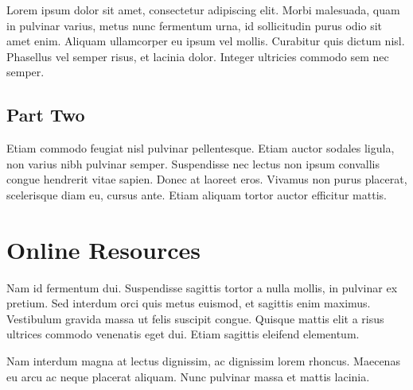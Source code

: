 \documentclass[manuscript,review,screen,nonacm,sigplan]{acmart}
\begin{document}
Lorem ipsum dolor sit amet, consectetur adipiscing elit. Morbi
malesuada, quam in pulvinar varius, metus nunc fermentum urna, id
sollicitudin purus odio sit amet enim. Aliquam ullamcorper eu ipsum
vel mollis. Curabitur quis dictum nisl. Phasellus vel semper risus, et
lacinia dolor. Integer ultricies commodo sem nec semper.

\subsection{Part Two}

Etiam commodo feugiat nisl pulvinar pellentesque. Etiam auctor sodales
ligula, non varius nibh pulvinar semper. Suspendisse nec lectus non
ipsum convallis congue hendrerit vitae sapien. Donec at laoreet
eros. Vivamus non purus placerat, scelerisque diam eu, cursus
ante. Etiam aliquam tortor auctor efficitur mattis.

\section{Online Resources}

Nam id fermentum dui. Suspendisse sagittis tortor a nulla mollis, in
pulvinar ex pretium. Sed interdum orci quis metus euismod, et sagittis
enim maximus. Vestibulum gravida massa ut felis suscipit
congue. Quisque mattis elit a risus ultrices commodo venenatis eget
dui. Etiam sagittis eleifend elementum.

Nam interdum magna at lectus dignissim, ac dignissim lorem
rhoncus. Maecenas eu arcu ac neque placerat aliquam. Nunc pulvinar
massa et mattis lacinia.
\end{document}
